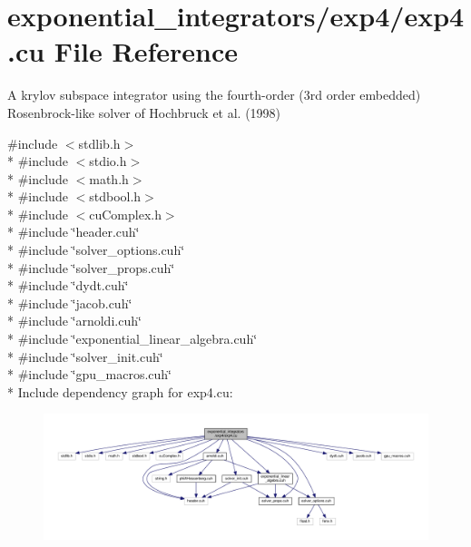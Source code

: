 \hypertarget{exp4_8cu}{}\section{exponential\+\_\+integrators/exp4/exp4.cu File Reference}
\label{exp4_8cu}


A krylov subspace integrator using the fourth-\/order (3rd order embedded) Rosenbrock-\/like solver of Hochbruck et al. (1998)  


{\ttfamily \#include $<$stdlib.\+h$>$}\\*
{\ttfamily \#include $<$stdio.\+h$>$}\\*
{\ttfamily \#include $<$math.\+h$>$}\\*
{\ttfamily \#include $<$stdbool.\+h$>$}\\*
{\ttfamily \#include $<$cu\+Complex.\+h$>$}\\*
{\ttfamily \#include \char`\"{}header.\+cuh\char`\"{}}\\*
{\ttfamily \#include \char`\"{}solver\+\_\+options.\+cuh\char`\"{}}\\*
{\ttfamily \#include \char`\"{}solver\+\_\+props.\+cuh\char`\"{}}\\*
{\ttfamily \#include \char`\"{}dydt.\+cuh\char`\"{}}\\*
{\ttfamily \#include \char`\"{}jacob.\+cuh\char`\"{}}\\*
{\ttfamily \#include \char`\"{}arnoldi.\+cuh\char`\"{}}\\*
{\ttfamily \#include \char`\"{}exponential\+\_\+linear\+\_\+algebra.\+cuh\char`\"{}}\\*
{\ttfamily \#include \char`\"{}solver\+\_\+init.\+cuh\char`\"{}}\\*
{\ttfamily \#include \char`\"{}gpu\+\_\+macros.\+cuh\char`\"{}}\\*
Include dependency graph for exp4.\+cu\+:\nopagebreak
\begin{figure}[H]
\begin{center}
\leavevmode
\includegraphics[width=350pt]{exp4_8cu__incl}
\end{center}
\end{figure}
